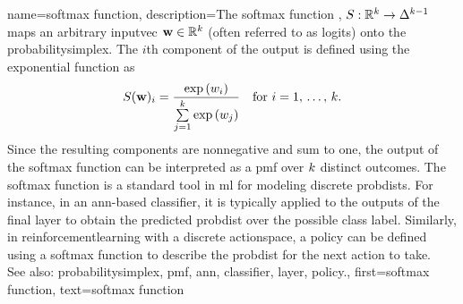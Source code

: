 {name={softmax function},
	description={The softmax \gls{function} \cite{bridle1989training}, \cite{bridle1990probabilistic}
		$S: \mathbb{R}^k \rightarrow \Delta^{k-1}$ maps an 
		arbitrary \gls{inputvec} ${\bf w} \in \mathbb{R}^k$ (often referred to as logits) 
		onto the \gls{probabilitysimplex}. The $i$th component of the output is defined using 
		the exponential \gls{function} as
		\begin{equation}\label{eq:softmax_function_dict}
			\nonumber
			S({\bf w})_i 
            =   \frac{\exp\,(w_i)}{\sum\limits_{j=1}^{k} \exp\,(w_j)} \quad \text{for } i=1,\,\ldots,\,k.
		\end{equation}
		Since the resulting components are nonnegative and sum to one, the output of the 
		softmax \gls{function} can be interpreted as a \gls{pmf} over $k$ distinct \glspl{outcome}.
		The softmax \gls{function} is a standard tool in \gls{ml} for modeling discrete \glspl{probdist}. 
		For instance, in an \gls{ann}-based \gls{classifier}, it is typically applied 
		to the \glspl{output} of the final \gls{layer} to obtain the predicted \gls{probdist} over the possible class \gls{label}. 
		Similarly, in \gls{reinforcementlearning} with a discrete 
		\gls{actionspace}, a \gls{policy} can be defined using a softmax \gls{function} to 
		describe the \gls{probdist} for the next \gls{action} to take.
		\\
		See also: \gls{probabilitysimplex}, \gls{pmf}, \gls{ann}, \gls{classifier}, \gls{layer}, \gls{policy}.},
	first={softmax function},
	text={softmax function}
}

